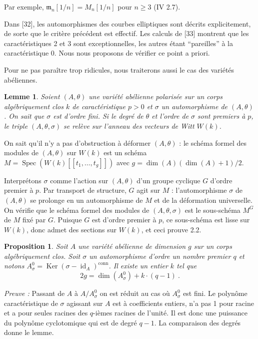 \documentclass[10pt,a4paper]{amsart}
\theoremstyle{plain}
\newtheorem{lemma}[theorem]{Lemme}
\newtheorem{proposition}[theorem]{Proposition}
\theoremstyle{definition}
\DeclareMathOperator{\Spec}{Spec}
\DeclareMathOperator{\Ker}{Ker}
\newcommand{\m}{\mathfrak{m}}
\DeclareMathOperator{\id}{id}
\begin{document}
Par exemple, $\m_n[1/n] = M_n[1/n]$ pour $n \geq 3$ (IV 2.7).

Dans [32], les automorphismes des courbes elliptiques sont d\'ecrits explicitement, de sorte que le crit\`ere pr\'ec\'edent est effectif. Les calculs de [33] montrent que les caract\'eristiques 2 et 3 sont exceptionnelles, les autres \'etant ``pareilles'' \`a la caract\'eristique 0. Nous nous proposons de v\'erifier ce point a priori.

Pour ne pas para\^itre trop ridicules, nous traiterons aussi le cas des vari\'et\'es ab\'eliennes.

\setcounter{theorem}{1}
\begin{lemma}
Soient $(A,\theta)$ une vari\'et\'e ab\'elienne polaris\'ee sur un corps alg\'ebriquement clos $k$ de caract\'eristique $p > 0$ et $\sigma$ un automorphisme de $(A,\theta)$. On sait que $\sigma$ est d'ordre fini. Si le degr\'e de $\theta$ et l'ordre de $\sigma$ sont premiers \`a $p$, le triple $(A,\theta,\sigma)$ se rel\`eve sur l'anneau des vecteurs de Witt $W(k)$.
\end{lemma}

On sait qu'il n'y a pas d'obstruction \`a d\'eformer $(A,\theta)$ : le sch\'ema formel des modules de $(A,\theta)$ sur $W(k)$ est un sch\'ema $M = \Spec(W(k)[[t_1, \ldots, t_g]])$ avec $g = \dim(A)(\dim(A)+1)/2$.

Interpr\'etons $\sigma$ comme l'action sur $(A,\theta)$ d'un groupe cyclique $G$ d'ordre premier \`a $p$. Par transport de structure, $G$ agit sur $M$ : l'automorphisme $\sigma$ de $(A,\theta)$ se prolonge en un automorphisme de $M$ et de la d\'eformation universelle. On v\'erifie que le sch\'ema formel des modules de $(A,\theta,\sigma)$ est le sous-sch\'ema $M^G$ de $M$ fix\'e par $G$. Puisque $G$ est d'ordre premier \`a $p$, ce sous-sch\'ema est lisse sur $W(k)$, donc admet des sections sur $W(k)$, et ceci prouve 2.2.

\setcounter{theorem}{2}
\begin{proposition}
Soit $A$ une vari\'et\'e ab\'elienne de dimension $g$ sur un corps alg\'ebriquement clos. Soit $\sigma$ un automorphisme d'ordre un nombre premier $q$ et notons $A_\sigma^0 = \Ker(\sigma - \id_A)^{\mathrm{conn}}$. Il existe un entier $k$ tel que
\[
2g = \dim(A_\sigma^0) + k \cdot (q-1)\ .
\]
\end{proposition}

\noindent\emph{Preuve :} Passant de $A$ \`a $A/A_\sigma^0$ on est r\'eduit au cas o\`u $A_\sigma^0$ est fini. Le polyn\^ome caract\'eristique de $\sigma$ agissant sur $A$ est \`a coefficients entiers, n'a pas 1 pour racine et a pour seules racines des $q$-i\`emes racines de l'unit\'e. Il est donc une puissance du polyn\^ome cyclotomique qui est de degr\'e $q-1$. La comparaison des degr\'es donne le lemme.
\end{document}
